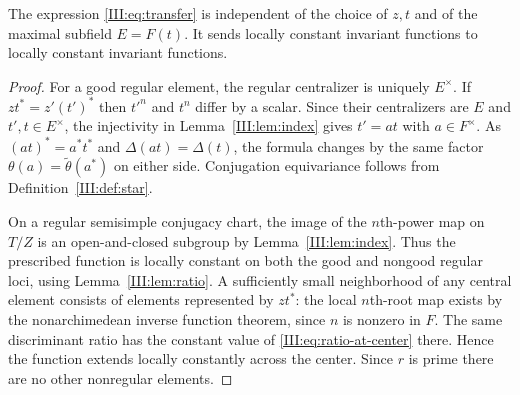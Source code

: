 \begin{lemma}\label{III:lem:well-defined}
The expression \eqref{III:eq:transfer} is independent of the choice of $z,t$ and of the maximal subfield $E=F(t)$. It sends locally constant invariant functions to locally constant invariant functions.
\end{lemma}
\begin{proof}
For a good regular element, the regular centralizer is uniquely $E^\times$. If $zt^*=z'(t')^*$ then $t'^n$ and $t^n$ differ by a scalar. Since their centralizers are $E$ and $t',t\in E^\times$, the injectivity in Lemma~\ref{III:lem:index} gives $t'=at$ with $a\in F^\times$. As $(at)^*=a^*t^*$ and $\Delta(at)=\Delta(t)$, the formula changes by the same factor $\theta(a)=\widetilde\theta(a^*)$ on either side. Conjugation equivariance follows from Definition~\ref{III:def:star}.

On a regular semisimple conjugacy chart, the image of the $n$th-power map on $T/Z$ is an open-and-closed subgroup by Lemma~\ref{III:lem:index}. Thus the prescribed function is locally constant on both the good and nongood regular loci, using Lemma~\ref{III:lem:ratio}. A sufficiently small neighborhood of any central element consists of elements represented by $z t^*$: the local $n$th-root map exists by the nonarchimedean inverse function theorem, since $n$ is nonzero in $F$. The same discriminant ratio has the constant value of \eqref{III:eq:ratio-at-center} there. Hence the function extends locally constantly across the center. Since $r$ is prime there are no other nonregular elements.
\end{proof}

